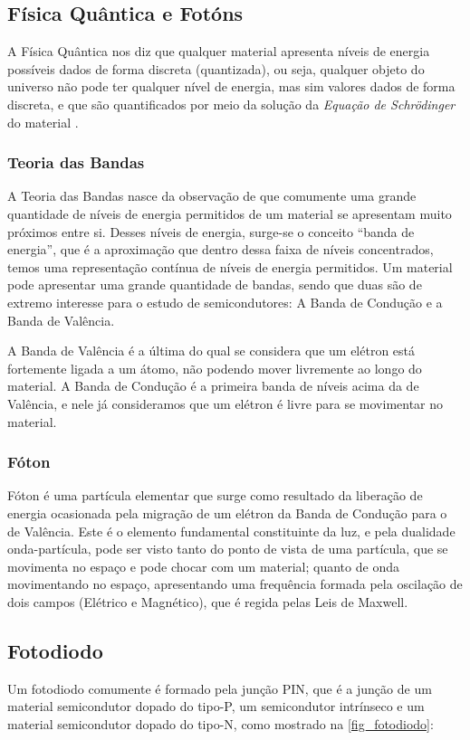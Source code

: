 \subsection{Física Quântica e Fotóns}
A Física Quântica nos diz que qualquer material apresenta níveis de energia possíveis dados de forma discreta (quantizada), ou seja, qualquer objeto do universo não pode ter qualquer nível de energia, mas sim valores dados de forma discreta, e que são quantificados por meio da solução da \textit{Equação de Schrödinger} do material \cite{Sze, JohnSingleton}.


\subsubsection{Teoria das Bandas}

A Teoria das Bandas nasce da observação de que comumente uma grande quantidade de níveis de energia permitidos de um material se apresentam muito próximos entre si. Desses níveis de energia, surge-se o conceito “banda de energia”, que \'e a aproximação que dentro dessa faixa de níveis concentrados, temos uma representação contínua de níveis de energia permitidos. Um material pode apresentar uma grande quantidade de bandas, sendo que duas são de extremo interesse para o estudo de semicondutores: A Banda de Condução e a Banda de Valência.

A Banda de Valência \'e a última do qual se considera que um el\'etron está fortemente ligada a um átomo, não podendo mover livremente ao longo do material. A Banda de Condução \'e a primeira banda de níveis acima da de Valência, e nele já consideramos que um el\'etron \'e livre para se movimentar no material.

\subsubsection{Fóton}

Fóton \'e uma partícula elementar que surge como resultado da liberação de energia ocasionada pela migração de um el\'etron da Banda de Condução para o de Valência. Este \'e o elemento fundamental constituinte da luz, e pela dualidade onda-partícula, pode ser visto tanto do ponto de vista de uma partícula, que se movimenta no espaço e pode chocar com um material; quanto de onda movimentando no espaço, apresentando uma frequência formada pela oscilação de dois campos (El\'etrico e Magn\'etico), que \'e regida pelas Leis de Maxwell.

\subsection{Fotodiodo}
\label{secao_fotodiodo}
Um fotodiodo comumente \'e formado pela junção PIN, que \'e a junção de um material semicondutor dopado do tipo-P, um semicondutor intrínseco e um material semicondutor dopado do tipo-N, como mostrado na \autoref{fig_fotodiodo}:

